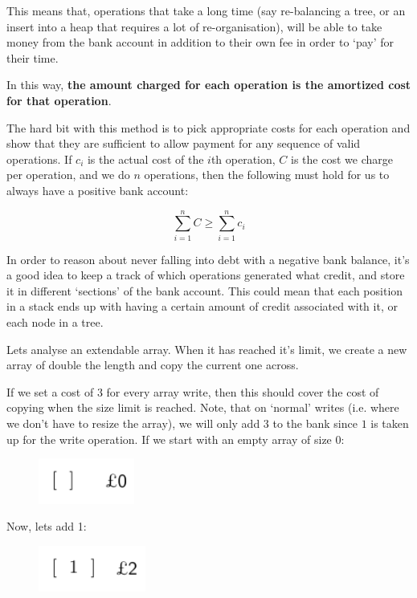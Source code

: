 This means that, operations that take a long time (say re-balancing a tree, or
an insert into a heap that requires a lot of re-organisation), will be able to
take money from the bank account in addition to their own fee in order to `pay'
for their time.

In this way, \textbf{the amount charged for each operation is the amortized cost
for that operation}.

The hard bit with this method is to pick appropriate costs for each operation
and show that they are sufficient to allow payment for any sequence of valid
operations. If $c_i$ is the actual cost of the $i$th operation, $C$ is the cost
we charge per operation, and we do $n$ operations, then the following must hold
for us to always have a positive bank account:

\[
  \sum\limits_{i = 1}^nC \geq \sum\limits_{i=1}^nc_i
\]

In order to reason about never falling into debt with a negative bank balance,
it's a good idea to keep a track of which operations generated what credit, and
store it in different `sections' of the bank account. This could mean that each
position in a stack ends up with having a certain amount of credit associated
with it, or each node in a tree.

Lets analyse an extendable array. When it has reached it's limit, we create a
new array of double the length and copy the current one across.

If we set a cost of $3$ for every array write, then this should cover the cost
of copying when the size limit is reached. Note, that on `normal' writes (i.e.
where we don't have to resize the array), we will only add $3$ to the bank since
\textsterling $1$ is taken up for the write operation. If we start with an empty
array of size 0:

\begin{figure}[H]
  \centering
  \includegraphics[height=15mm]{diagrams/banker0.pdf}
  \label{banker0}
\end{figure}

Now, lets add 1:

\begin{figure}[H]
  \centering
  \includegraphics[height=15mm]{diagrams/banker1.pdf}
  \label{banker1}
\end{figure}

